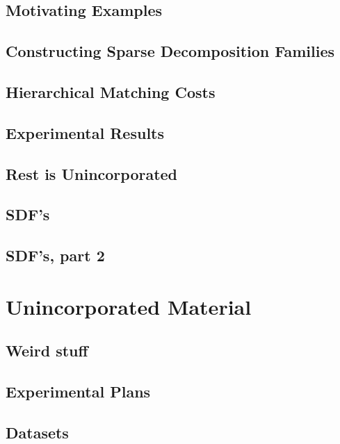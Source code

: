 \documentclass{tufte-book}
\begin{document}
  \section{Motivating Examples}

  \section{Constructing Sparse Decomposition Families}

  \section{Hierarchical Matching Costs}

  \section{Experimental Results}

  \section{Rest is Unincorporated}

  \section{SDF's}
    

  \section{SDF's, part 2}
    

\chapter{Unincorporated Material}

  \section{Weird stuff}
    
    
    
    

  \section{Experimental Plans}
    

  \section{Datasets}
    
    
    
    





\backmatter




\printindex
\end{document}

